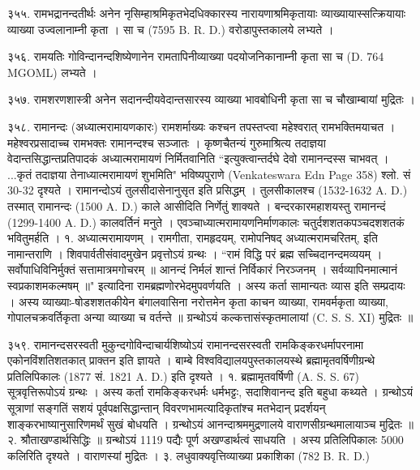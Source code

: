 ३५५. रामभद्रानन्दतीर्थः
अनेन नृसिम्हाश्रमिकृतभेदधिक्कारस्य नारायणाश्रमिकृतायाः व्याख्यायास्सत्क्रियायाः व्याख्या उज्वलानाम्नी कृता । सा च (7595 B. R. D.) वरोडापुस्तकालये लभ्यते ।

३५६. रामयतिः
गोविन्दानन्दशिष्येणानेन रामतापिनीव्याख्या पदयोजनिकानाम्नी कृता सा च (D. 764 MGOML) लभ्यते ।

३५७. रामशरणशास्त्री
अनेन सदानन्दीयवेदान्तसारस्य व्याख्या भावबोधिनी कृता सा च चौखाम्बायां मुद्रितः ।

३५८. रामानन्दः (अध्यात्मरामायणकारः)
रामशर्माख्यः कश्चन तपस्तप्त्वा महेश्वरात् रामभक्तिमयाचत । महेश्वरप्रसादाच्च रामभक्तः रामानन्दश्च सञ्जातः । कृष्णचैतन्यं गुरुमाश्रित्य तदाज्ञया वेदान्तसिद्धान्तप्रतिपादकं अध्यात्मरामायणं निर्मितवानिति ``इत्युक्त्वान्तर्दघे देवो रामानन्दस्स चाभवत् । ...कृतं तदाज्ञया तेनाध्यात्मरामायणं शुभमिति" भविष्यपुराणे (Venkateswara Edn Page 358) श्लो. सं 30-32 दृश्यते । रामानन्दोऽयं तुलसीदासेनानुसृत इति प्रसिद्धम् । तुलसीकालश्च (1532-1632 A. D.) तस्मात् रामानन्दः (1500 A. D.) काले आसीदिति निर्णेतुं शाक्यते । बन्दरकारमहाशयस्तु रामानन्दं (1299-1400 A. D.) कालवर्तिनं मनुते । एवञ्चाध्यात्मरामायणनिर्माणकालः चतुर्दशशतकपञ्चदशशतकं भवितुमर्हति ।
१. अध्यात्मरामायणम् । रामगीता, रामहृदयम्, रामोपनिषद् अध्यात्मरामचरितम्, इति नामान्तराणि । शिवपार्वतीसंवादमुखेन प्रवृत्तोऽयं ग्रन्थः ।
``रामं विद्धि परं ब्रह्म सच्चिदानन्दमव्ययम् ।
सर्वोपाधिविनिर्मुक्तं सत्तामात्रमगोचरम् ॥
आनन्दं निर्मलं शान्तं निर्विकारं निरञ्जनम् ।
सर्वव्यापिनमात्मानं स्वप्रकाशमकल्मषम् ॥"
इत्यादिना रामब्रह्मणोरभेदमुपवर्णयति । अस्य कर्ता सामान्यतः व्यास इति सम्प्रदायः । अस्य व्याख्याः-षोडशशतकीयेन बंगालवासिना नरोत्तमेन कृता काचन व्याख्या, रामवर्मकृता व्याख्या, गोपालचक्रवर्तिकृता अन्या व्याख्या च वर्तन्ते ॥ ग्रन्थोऽयं कल्कत्तासंस्कृतमालायां (C. S. S. XI) मुद्रितः ॥

३५९. रामानन्दसरस्वती
मुकुन्दगोविन्दाचार्यशिष्योऽयं रामानन्दसरस्वती रामकिङ्करधर्मापरनामा एकोनविंशतिशतकात् प्राक्तन इति ज्ञायते । बाम्बे विश्वविद्यालयपुस्तकालयस्थे ब्रह्मामृतवर्षिणीग्रन्थे प्रतिलिपिकालः (1877 सं. 1821 A. D.) इति दृश्यते ।
१. ब्रह्मामृतवर्षिणी (A. S. S. 67) सूत्रवृत्तिरूपोऽयं ग्रन्थः । अस्य कर्ता रामकिङ्करधर्मः धर्मभट्टः, सदाशिवानन्द इति बहुधा कथ्यते । ग्रन्थोऽयं सूत्राणां सङ्गतिं सशयं पूर्वपक्षसिद्धान्तान् विवरणभामत्यादिकृतांश्च मतभेदान् प्रदर्शयन् शाङ्करभाष्यानुसारिणमर्थं सुखं बोधयति । ग्रन्थोऽयं आनन्दाश्रममुद्रणालये वाराणसीग्रन्थमालायाञ्च मुद्रितः ॥
२. श्रौताखण्डार्थसिद्धिः ॥ ग्रन्थोऽयं 1119 पद्यैः पूर्ण अखण्डार्थत्वं साधयति । अस्य प्रतिलिपिकालः 5000 कलिरिति दृश्यते । वाराणस्यां मुद्रितः ।
३. लधुवाक्यवृत्तिव्याख्या प्रकाशिका (782 B. R. D.)

